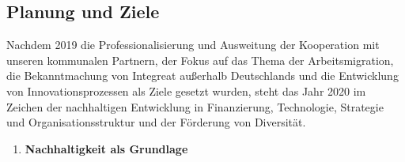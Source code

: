 \documentclass[12pt, a4paper]{article} %
\begin{document}
\hypertarget{planung-und-ziele}{%
\subsection{Planung und Ziele}\label{planung-und-ziele}}

Nachdem 2019 die Professionalisierung und Ausweitung der Kooperation mit
unseren kommunalen Partnern, der Fokus auf das Thema der
Arbeitsmigration, die Bekanntmachung von Integreat außerhalb
Deutschlands und die Entwicklung von Innovationsprozessen als Ziele
gesetzt wurden, steht das Jahr 2020 im Zeichen der nachhaltigen
Entwicklung in Finanzierung, Technologie, Strategie und
Organisationsstruktur und der Förderung von Diversität.

\begin{enumerate}
\def\labelenumi{\arabic{enumi}.}
\item
  \textbf{Nachhaltigkeit als Grundlage}
\end{enumerate}
\end{document}
